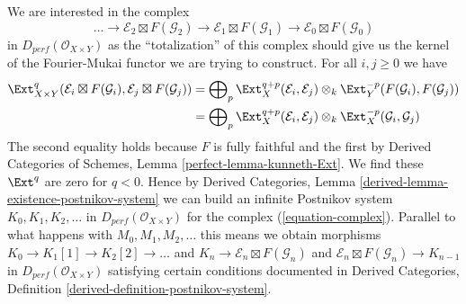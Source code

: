 \medskip\noindent
We are interested in the complex
\begin{equation}
\label{equation-complex}
\ldots \to
\mathcal{E}_2 \boxtimes F(\mathcal{G}_2) \to
\mathcal{E}_1 \boxtimes F(\mathcal{G}_1) \to
\mathcal{E}_0 \boxtimes F(\mathcal{G}_0)
\end{equation}
in $D_{perf}(\mathcal{O}_{X \times Y})$
as the ``totalization'' of this complex should
give us the kernel of the Fourier-Mukai functor we are trying to construct.
For all $i, j \geq 0$ we have
\begin{align*}
\Ext^q_{X \times Y}(\mathcal{E}_i \boxtimes F(\mathcal{G}_i),
\mathcal{E}_j \boxtimes F(\mathcal{G}_j))
& =
\bigoplus\nolimits_p
\Ext^{q + p}_X(\mathcal{E}_i, \mathcal{E}_j) \otimes_k
\Ext^{-p}_Y(F(\mathcal{G}_i), F(\mathcal{G}_j)) \\
& =
\bigoplus\nolimits_p
\Ext^{q + p}_X(\mathcal{E}_i, \mathcal{E}_j) \otimes_k
\Ext^{-p}_X(\mathcal{G}_i, \mathcal{G}_j)
\end{align*}
The second equality holds because $F$ is
fully faithful and the first by
Derived Categories of Schemes, Lemma \ref{perfect-lemma-kunneth-Ext}.
We find these $\Ext^q$ are zero for $q < 0$.
Hence by
Derived Categories, Lemma \ref{derived-lemma-existence-postnikov-system}
we can build an infinite Postnikov system $K_0, K_1, K_2, \ldots$
in $D_{perf}(\mathcal{O}_{X \times Y})$ for the complex
(\ref{equation-complex}).
Parallel to what happens with $M_0, M_1, M_2, \ldots$ this means we
obtain morphisms
$K_0 \to K_1[1] \to K_2[2] \to \ldots$ and
$K_n \to \mathcal{E}_n \boxtimes F(\mathcal{G}_n)$ and
$\mathcal{E}_n \boxtimes F(\mathcal{G}_n) \to K_{n - 1}$
in $D_{perf}(\mathcal{O}_{X \times Y})$
satisfying certain conditions documented in
Derived Categories, Definition \ref{derived-definition-postnikov-system}.

